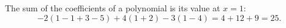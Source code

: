 The sum of the coefficients of a polynomial is its value at $x=1$:
\[-2(1-1+3-5)+4(1+2)-3(1-4)=4+12+9=\boxed{25}.\]

